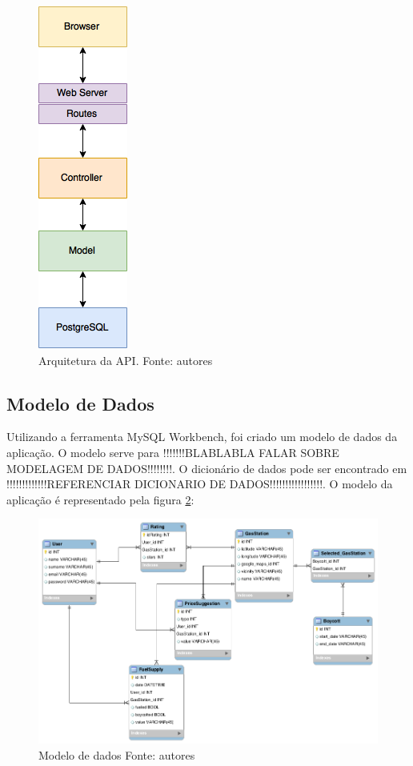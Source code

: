 \begin{figure}[H]
    \centering
    \includegraphics[scale=0.5]{figuras/api_arch.png}
    \caption[Arquitetura da API]{Arquitetura da API. Fonte: autores}
    \label{img:arquitetura}
\end{figure}


\subsection{Modelo de Dados}

Utilizando a ferramenta MySQL Workbench, foi criado um modelo de dados da aplicação. O modelo serve para !!!!!!!BLABLABLA FALAR SOBRE MODELAGEM DE DADOS!!!!!!!!. O dicionário de dados pode ser encontrado em !!!!!!!!!!!!!REFERENCIAR DICIONARIO DE DADOS!!!!!!!!!!!!!!!!!. O modelo da aplicação é representado pela figura \ref{img:modelo_de_dados}:

\begin{figure}[H]
    \centering
    \includegraphics[scale=0.5]{figuras/db_model.png}
    \caption[Modelo de dados]{Modelo de dados Fonte: autores}
    \label{img:modelo_de_dados}
\end{figure}

